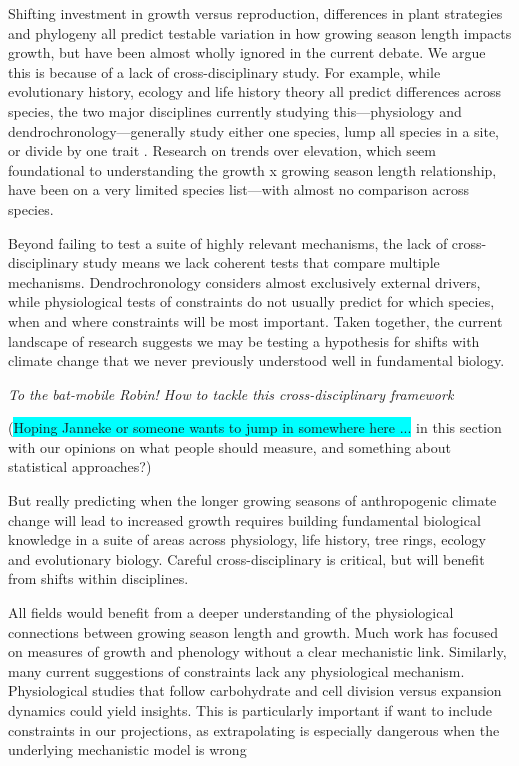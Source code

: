 \documentclass[11pt]{article}
\begin{document}
Shifting investment in growth versus reproduction, differences in plant strategies and phylogeny all predict testable variation in how growing season length impacts growth, but have been almost wholly ignored in the current debate. We argue this is because of a lack of cross-disciplinary study. For example, while evolutionary history, ecology and life history theory all predict differences across species, the two major disciplines currently studying this---physiology and dendrochronology---generally study either one species, lump all species in a site, or divide by one trait \citep[e.g.,][]{dow2022warm}. Research on trends over elevation, which seem foundational to understanding the growth x growing season length relationship, have been on a very limited species list---with almost no comparison across species. %

Beyond failing to test a suite of highly relevant mechanisms, the lack of cross-disciplinary study means we lack coherent tests that compare multiple mechanisms. Dendrochronology considers almost exclusively external drivers, while physiological tests of constraints do not usually predict for which species, when and where constraints will be most important. Taken together, the current landscape of research suggests we may be testing a hypothesis for shifts with climate change that we never previously understood well in fundamental biology. 

\emph{To the bat-mobile Robin! How to tackle this cross-disciplinary framework}





(\colorbox{cyan}{Hoping Janneke or someone wants to jump in somewhere here ...} in this section with our opinions on what people should measure, and something about statistical approaches?)

But really predicting when the longer growing seasons of anthropogenic climate change will lead to increased growth requires building fundamental biological knowledge in a suite of areas across physiology, life history, tree rings, ecology and evolutionary biology. Careful cross-disciplinary is critical, but will benefit from shifts within disciplines. 

All fields would benefit from a deeper understanding of the physiological connections between growing season length and growth. Much work has focused on measures of growth and phenology without a clear mechanistic link. Similarly, many current suggestions of constraints lack any physiological mechanism. Physiological studies that follow carbohydrate and cell division versus expansion dynamics could yield insights. This is particularly important if want to include constraints in our projections, as extrapolating is especially dangerous when the underlying mechanistic model is wrong
\end{document}
